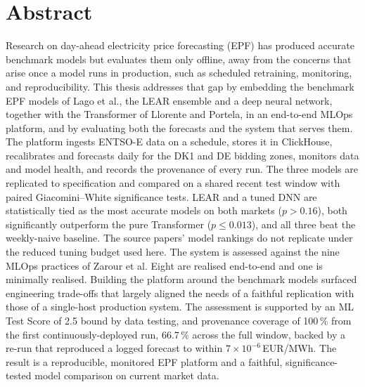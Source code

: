 \section*{Abstract}
Research on day-ahead electricity price forecasting (EPF) has produced accurate
benchmark models but evaluates them only offline, away from the concerns that
arise once a model runs in production, such as scheduled retraining, monitoring,
and reproducibility. This thesis addresses that gap by embedding the benchmark
EPF models of Lago et al., the LEAR ensemble and a deep neural network, together
with the Transformer of Llorente and Portela, in an end-to-end MLOps platform,
and by evaluating both the forecasts and the system that serves them.
The platform ingests ENTSO-E data on a schedule, stores it in ClickHouse,
recalibrates and forecasts daily for the DK1 and DE bidding zones, monitors data
and model health, and records the provenance of every run. The three models are
replicated to specification and compared on a shared recent test window with
paired Giacomini--White significance tests. LEAR and a
tuned DNN are statistically tied as the most accurate models on both markets
($p>0.16$), both significantly outperform the pure Transformer ($p\le0.013$), and
all three beat the weekly-naive baseline. The source papers' model rankings do
not replicate under the reduced tuning budget used here. The system is assessed
against the nine MLOps practices of Zarour et al. Eight are realised end-to-end
and one is minimally realised. Building the platform around the benchmark models
surfaced engineering trade-offs that largely aligned the needs of a faithful
replication with those of a single-host production system. The assessment is
supported by an ML Test Score
of 2.5 bound by data testing, and provenance coverage of 100\,\% from the
first continuously-deployed run, 66.7\,\% across the full window, backed by a
re-run that reproduced a logged forecast to within $7\times10^{-6}$\,EUR/MWh. The
result is a
reproducible, monitored EPF platform and a faithful, significance-tested model
comparison on current market data.
